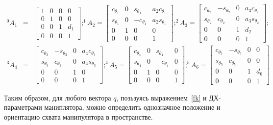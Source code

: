 \begin{align*}
	^0A_1 &=& 
	\left[\begin{matrix}1 & 0 & 0 & 0\\0 & 1 & 0 & 0\\0 & 0 & 1 & d_{1}\\0 & 0 & 0 & 1\end{matrix}\right]; 
	^1A_2 =
 	\left[\begin{matrix}c_{\theta_1} & 0 & s_{\theta_1} & a_{2} c_{\theta_1}\\s_{\theta_1} & 0 & - c_{\theta_1} & a_{2} s_{\theta_1}\\0 & 1 & 0 & 0\\0 & 0 & 0 & 1\end{matrix}\right];
	^2A_3 =
	\left[\begin{matrix}c_{\theta_2} & - s_{\theta_2} & 0 & a_{3} c_{\theta_2}\\s_{\theta_2} & c_{\theta_2} & 0 & a_{3} s_{\theta_2}\\0 & 0 & 1 & d_{2}\\0 & 0 & 0 & 1\end{matrix}\right];
	\\
	^3A_4 &=& 
	\left[\begin{matrix}c_{\theta_3} & - s_{\theta_3} & 0 & a_{4} c_{\theta_3}\\s_{\theta_3} & c_{\theta_3} & 0 & a_{4} s_{\theta_3}\\0 & 0 & 1 & 0\\0 & 0 & 0 & 1\end{matrix}\right];
	^4A_5 =
	 \left[\begin{matrix}c_{\theta_4} & 0 & s_{\theta_4} & 0\\s_{\theta_4} & 0 & - c_{\theta_4} & 0\\0 & 1 & 0 & 0\\0 & 0 & 0 & 1\end{matrix}\right];
	^5A_6 =
	\left[\begin{matrix}c_{\theta_5} & - s_{\theta_5} & 0 & 0\\s_{\theta_5} & c_{\theta_5} & 0 & 0\\0 & 0 & 1 & d_{6}\\0 & 0 & 0 & 1\end{matrix}\right]
\end{align*}

Таким образом, для любого вектора $q$, позьзуясь выражением~\eqref{fk} и ДХ-параметрами маниплятора, можно определить однозначное положение и ориентацию схвата манипулятора в пространстве.

